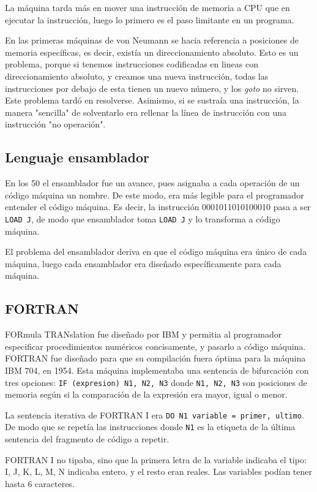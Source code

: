 \documentclass[a4paper]{article}
\begin{document}
	La máquina tarda más en mover una instrucción de memoria a CPU que en ejecutar la instrucción, luego lo primero es el paso limitante en un programa.
	
	En las primeras máquinas de von Neumann se hacia referencia a posiciones de memoria específicas, es decir, existía un direccionamiento absoluto. Esto es un problema, porque si tenemos instrucciones codificadas en lineas con direccionamiento absoluto, y creamos una nueva instrucción, todas las instrucciones por debajo de esta tienen un nuevo número, y los \textit{goto} no sirven. Este problema tardó en resolverse. Asimismo, si se sustraía una instrucción, la manera "sencilla" de solventarlo era rellenar la línea de instrucción con una instrucción "no operación".
	
	\subsection{Lenguaje ensamblador}
	En los 50 el ensamblador fue un avance, pues asignaba a cada operación de un código máquina un nombre. De este modo, era más legible para el programador entender el código máquina. Es decir, la instrucción 0001011010100010 pasa a ser \verb|LOAD J|, de modo que ensamblador toma \verb|LOAD J| y lo transforma a código máquina.
	
	El problema del ensamblador deriva en que el código máquina era único de cada máquina, luego cada ensamblador era diseñado específicamente para cada máquina.
	
	\subsection{FORTRAN}
	FORmula TRANslation fue diseñado por IBM y permitia al programador especificar procedimientos numéricos concisamente, y pasarlo a código máquina. FORTRAN fue diseñado para que su compilación fuera óptima para la máquina IBM 704, en 1954. Esta máquina implementaba una sentencia de bifurcación con tres opciones: \verb!IF (expresion) N1, N2, N3! donde \verb|N1, N2, N3| son posiciones de memoria según si la comparación de la expresión era mayor, igual o menor.
	
	La sentencia iterativa de FORTRAN I era \verb|DO N1 variable = primer, ultimo|. De modo que se repetía las instrucciones donde \verb|N1| es la etiqueta de la última sentencia del fragmento de código a repetir.
	
	FORTRAN I no tipaba, sino que la primera letra de la variable indicaba el tipo: I, J, K, L, M, N indicaba entero, y el resto eran reales. Las variables podían tener hasta 6 caracteres.
	
\end{document}
